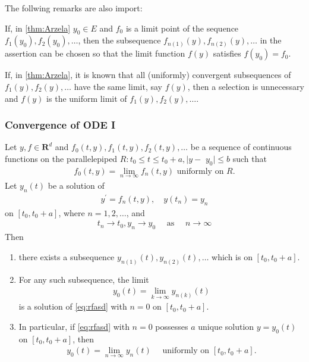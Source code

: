 \documentclass{article}
\begin{document}
The follwing remarks are also import:
\begin{rema}
If, in \cref{thm:Arzela} $y_{0} \in E$ and $f_{0}$ is a limit point of the sequence $f_{1}\left(y_{0}\right), f_{2}\left(y_{0}\right), \ldots$, then the subsequence $f_{n(1)}(y), f_{n(2)}(y), \ldots$ in the assertion can be chosen so that the limit function $f(y)$ satisfies $f\left(y_{0}\right)=f_{0}$.
\end{rema}
\begin{rema}\label{re:mdiohqefr}
If, in \cref{thm:Arzela}, it is known that all (uniformly) convergent subsequences of $f_{1}(y), f_{2}(y), \ldots$ have the same limit, say $f(y)$, then a selection is unnecessary and $f(y)$ is the uniform limit of $f_{1}(y), f_{2}(y), \ldots$.
\end{rema} 

\subsubsection{Convergence of ODE I}
\begin{thma}\label{thm:conv_ode}
Let $y, f \in \mathbf{R}^{d}$ and $f_{0}(t, y), f_{1}(t, y), f_{2}(t, y), \ldots$ be a sequence of continuous functions on the parallelepiped $R: t_{0} \le t \le t_{0}+a, \mid y-$ $y_{0} \mid \le b$ such that
\begin{align}
    f_{0}(t, y)=\lim _{n \rightarrow \infty} f_{n}(t, y)\text{ uniformly on }R. \label{eq:jdad}
\end{align}
Let $y_{n}(t)$ be a solution of
\begin{align}
    y^{\prime}=f_{n}(t, y), \quad y\left(t_{n}\right)=y_{n}\label{eq:rfasd}
\end{align}
on $\left[t_{0}, t_{0}+a\right]$, where $n=1,2, \ldots$, and
\begin{align}
    t_{n} \rightarrow t_{0}, y_{n} \rightarrow y_{0} \quad\text{ as }\quad n \rightarrow \infty
\end{align}
Then 
\begin{enumerate}[1)]
    \item there exists a subsequence $y_{n(1)}(t), y_{n(2)}(t), \ldots$ which is  on $\left[t_{0}, t_{0}+a\right]$. \item For any such subsequence, the limit
\begin{align}
y_{0}(t)=\lim _{k \rightarrow \infty} y_{n(k)}(t)\label{eq:dagz}
\end{align}
is a solution of \cref{eq:rfasd} with $n=0$ on $\left[t_{0}, t_{0}+a\right]$. 
\item In particular, if \cref{eq:rfasd} with $n=0$  possesses $a$ unique solution $y=y_{0}(t)$ on $\left[t_{0}, t_{0}+a\right]$, then
\begin{align}
y_{0}(t)=\lim _{n \rightarrow \infty} y_{n}(t) \quad \text { uniformly on }\left[t_{0}, t_{0}+a\right] .\label{eq:odadf}
\end{align}
\end{enumerate}
\end{thma} 
\end{document}
